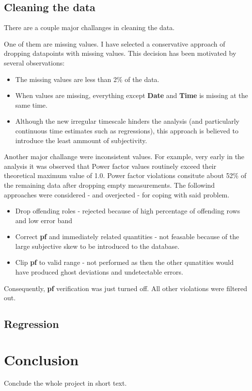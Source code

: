 \documentclass[11pt]{article}
\newcommand{\code}[1]{\textbf{#1}}
\newcommand{\para}[0]{\par\vspace{0.5cm}}
\begin{document}
\subsection{Cleaning the data}
There are a couple major challanges in cleaning the data.
\para
One of them are missing values.
I have selected a conservative approach of dropping datapoints with missing values.
This decision has been motivated by several observations:
\begin{itemize}
    \item{The missing values are less than 2\% of the data.}
    \item{When values are missing, everything except \code{Date} and \code{Time} is missing at the same time.}
    \item{Although the new irregular timescale hinders the analysis (and particularly continuous time estimates such as regressions), this approach is believed to introduce the least ammount of subjectivity.}
\end{itemize}
\para
Another major challange were inconsistent values.
For example, very early in the analysis it was observed that Power factor values routinely exceed their theoretical maximum value of 1.0.
Power factor violations consitute about 52\% of the remaining data after dropping empty measurements.
The followind approaches were considered - and overjected - for coping with said problem.
\begin{itemize}
    \item{Drop offending roles - rejected because of high percentage of offending rows and low error band}
    \item{Correct \code{pf} and immediately related quantities - not feasable because of the large subjective skew to be introduced to the database.}
    \item{Clip \code{pf} to valid range - not performed as then the other qunatities would have produced ghost deviations and undetectable errors.}
\end{itemize}
Consequently, \code{pf} verification was just turned off.
All other violations were filtered out.


\subsection{Regression}
\section{Conclusion}
Conclude the whole project in short text.
\end{document}
